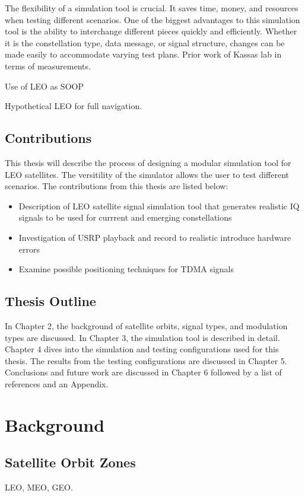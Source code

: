 \documentclass[12pt]{report}
\begin{document}
The flexibility of a simulation tool is crucial. It saves time, money, and resources when testing different scenarios. One of the biggest advantages to this simulation tool is the ability to interchange different pieces quickly and efficiently. Whether it is the constellation type, data message, or signal structure, changes can be made easily to accommodate varying test plans.
Prior work of Kassas lab in terms of measurements.

Use of LEO as SOOP

Hypothetical LEO for full navigation.

\section { Contributions}
This thesis will describe the process of designing a modular simulation tool for LEO satellites. The versitility of the simulator allows the user to test different scenarios. 
The contributions from this thesis are listed below:
\begin{itemize}
    \item Description of LEO satellite signal simulation tool that generates realistic IQ signals to be used for currrent and emerging constellations
    \item Investigation of USRP playback and record to realistic introduce hardware errors
    \item Examine possible positioning techniques for TDMA signals
    
\end{itemize}

\section{Thesis Outline}
In Chapter 2, the background of satellite orbits, signal types, and modulation types are discussed. In Chapter 3, the simulation tool is described in detail. Chapter 4 dives into the simulation and testing configurations used for this thesis. The results from the testing configurations are discussed in Chapter 5. Conclusions and future work are discussed in Chapter 6 followed by a list of references and an Appendix.


\chapter{Background}

\section{Satellite Orbit Zones}
LEO, MEO, GEO.
\end{document}

